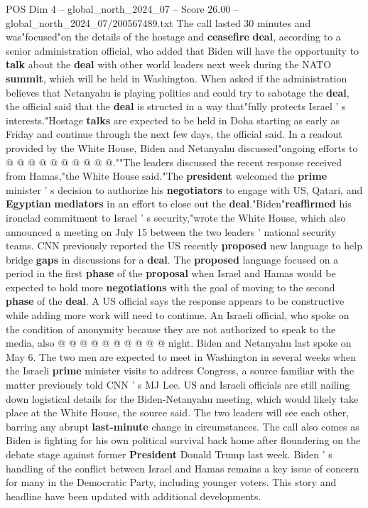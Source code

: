 \begin{textsample}{POS Dim 4 – global\_north\_2024\_07 – Score 26.00 – global\_north\_2024\_07/200567489.txt}
The call lasted 30 minutes and was"focused"on the details of the hostage and \textbf{ceasefire} \textbf{deal}, according to a senior administration official, who added that Biden will have the opportunity to \textbf{talk} about the \textbf{deal} with other world leaders next week during the NATO \textbf{summit}, which will be held in Washington.
When asked if the administration believes that Netanyahu is playing politics and could try to sabotage the \textbf{deal}, the official said that the \textbf{deal} is structed in a way that"fully protects Israel ' s interests."Hostage \textbf{talks} are expected to be held in Doha starting as early as Friday and continue through the next few days, the official said.
In a readout provided by the White House, Biden and Netanyahu discussed"ongoing efforts to @ @ @ @ @ @ @ @ @ @.""The leaders discussed the recent response received from Hamas,"the White House said."The \textbf{president} welcomed the \textbf{prime} minister ' s decision to authorize his \textbf{negotiators} to engage with US, Qatari, and \textbf{Egyptian} \textbf{mediators} in an effort to close out the \textbf{deal}."Biden"\textbf{reaffirmed} his ironclad commitment to Israel ' s security,"wrote the White House, which also announced a meeting on July 15 between the two leaders ' national security teams.
CNN previously reported the US recently \textbf{proposed} new language to help bridge \textbf{gaps} in discussions for a \textbf{deal}.
The \textbf{proposed} language focused on a period in the first \textbf{phase} of the \textbf{proposal} when Israel and Hamas would be expected to hold more \textbf{negotiations} with the goal of moving to the second \textbf{phase} of the \textbf{deal}.
A US official says the response appears to be constructive while adding more work will need to continue.
An Israeli official, who spoke on the condition of anonymity because they are not authorized to speak to the media, also @ @ @ @ @ @ @ @ @ @ night.
Biden and Netanyahu last spoke on May 6.
The two men are expected to meet in Washington in several weeks when the Israeli \textbf{prime} minister visits to address Congress, a source familiar with the matter previously told CNN ' s MJ Lee.
US and Israeli officials are still nailing down logistical details for the Biden-Netanyahu meeting, which would likely take place at the White House, the source said.
The two leaders will see each other, barring any abrupt \textbf{last-minute} change in circumstances.
The call also comes as Biden is fighting for his own political survival back home after floundering on the debate stage against former \textbf{President} Donald Trump last week.
Biden ' s handling of the conflict between Israel and Hamas remains a key issue of concern for many in the Democratic Party, including younger voters.
This story and headline have been updated with additional developments.

\end{textsample}
